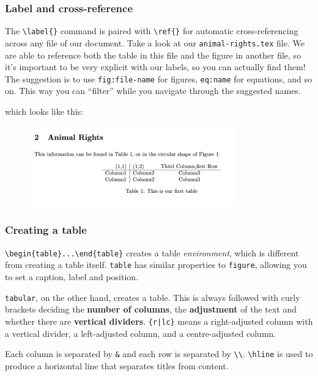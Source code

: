 \subsubsection{Label and cross-reference}
The \verb|\label{}| command is paired with \verb|\ref{}| for automatic cross-referencing across any file of our document.
Take a look at our \verb|animal-rights.tex| file.
We are able to reference both the table in this file and the figure in another file, so it's important to be very explicit with our labels, so you can actually find them!
The suggestion is to use \verb|fig:file-name| for figures, \verb|eq:name| for equations, and so on.
This way you can ``filter'' while you navigate through the suggested names.


which looks like this:
\begin{figure}[h]
    \centering
        \includegraphics[width=0.8\textwidth]{figures/tables.png}
    \label{fig:tables}
\end{figure}

\subsubsection{Creating a table}
\verb|\begin{table}...\end{table}| creates a table \emph{environment}, which is different from creating a table itself.
\verb|table| has similar properties to \verb|figure|, allowing you to set a caption, label and position.

\verb|tabular|, on the other hand, creates a table. This is always followed with curly brackets deciding the \textbf{number of columns}, the \textbf{adjustment} of the text and whether there are \textbf{vertical dividers}.
\verb!{r|lc}! means a right-adjusted column with a vertical divider, a left-adjusted column, and a centre-adjusted column.

Each column is separated by \verb|&| and each row is separated by \verb|\\|. \verb|\hline| is used to produce a horizontal line that separates titles from content.
